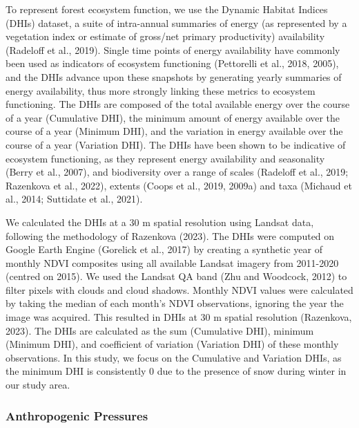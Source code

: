 \documentclass[
]{agujournal2019}
\begin{document}
To represent forest ecosystem function, we use the Dynamic Habitat
Indices (DHIs) dataset, a suite of intra-annual summaries of energy (as
represented by a vegetation index or estimate of gross/net primary
productivity) availability (Radeloff et al., 2019). Single time points
of energy availability have commonly been used as indicators of
ecosystem functioning (Pettorelli et al., 2018, 2005), and the DHIs
advance upon these snapshots by generating yearly summaries of energy
availability, thus more strongly linking these metrics to ecosystem
functioning. The DHIs are composed of the total available energy over
the course of a year (Cumulative DHI), the minimum amount of energy
available over the course of a year (Minimum DHI), and the variation in
energy available over the course of a year (Variation DHI). The DHIs
have been shown to be indicative of ecosystem functioning, as they
represent energy availability and seasonality (Berry et al., 2007), and
biodiversity over a range of scales (Radeloff et al., 2019; Razenkova et
al., 2022), extents (Coops et al., 2019, 2009a) and taxa (Michaud et
al., 2014; Suttidate et al., 2021).

We calculated the DHIs at a 30 m spatial resolution using Landsat data,
following the methodology of Razenkova (2023). The DHIs were computed on
Google Earth Engine (Gorelick et al., 2017) by creating a synthetic year
of monthly NDVI composites using all available Landsat imagery from
2011-2020 (centred on 2015). We used the Landsat QA band (Zhu and
Woodcock, 2012) to filter pixels with clouds and cloud shadows. Monthly
NDVI values were calculated by taking the median of each month's NDVI
observations, ignoring the year the image was acquired. This resulted in
DHIs at 30 m spatial resolution (Razenkova, 2023). The DHIs are
calculated as the sum (Cumulative DHI), minimum (Minimum DHI), and
coefficient of variation (Variation DHI) of these monthly observations.
In this study, we focus on the Cumulative and Variation DHIs, as the
minimum DHI is consistently 0 due to the presence of snow during winter
in our study area.

\subsubsection{Anthropogenic Pressures}\label{anthropogenic-pressures}
\end{document}
